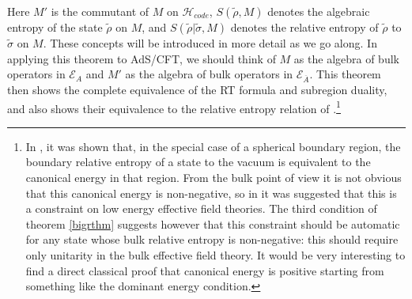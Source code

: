 \documentclass[12pt]{article}
\newcommand{\wt}{\widetilde}
\newcommand{\Ab}{\ol{A}}
\newcommand{\Hc}{\mathcal{H}_{code}}
\newcommand{\ol}{\overline}
\newcommand{\EA}{\mathcal{E}_A}
\begin{document}
Here $M'$ is the commutant of $M$ on $\Hc$, $S(\wt{\rho},M)$ denotes the algebraic entropy of the state $\wt{\rho}$ on $M$, and $S(\wt{\rho}|\wt{\sigma},M)$ denotes the relative entropy of $\wt{\rho}$ to $\wt{\sigma}$ on $M$. These concepts will be introduced in more detail as we go along.  In applying this theorem to AdS/CFT, we should think of $M$ as the algebra of bulk operators in $\EA$ and $M'$ as the algebra of bulk operators in $\mathcal{E}_{\Ab}$.  This theorem then shows the complete equivalence of the RT formula and subregion duality, and also shows their equivalence to the relative entropy relation of \cite{Jafferis:2015del}.\footnote{In \cite{Lashkari:2016idm}, it was shown that, in the special case of a spherical boundary region, the boundary relative entropy of a state to the vacuum is equivalent to the canonical energy in that region.  From the bulk point of view it is not obvious that this canonical energy is non-negative, so in \cite{Lashkari:2016idm} it was suggested that this is a constraint on low energy effective field theories.  The third condition of theorem \ref{bigrthm} suggests however that this constraint should be automatic for any state whose bulk relative entropy is non-negative: this should require only unitarity in the bulk effective field theory.  It would be very interesting to find a direct classical proof that canonical energy is positive starting from something like the dominant energy condition.}
\end{document}
